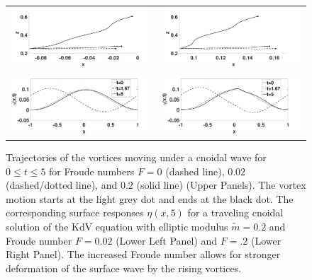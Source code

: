 \documentclass[a4paper,11pt]{article}
\begin{document}
\begin{figure}[h]
\centering
\begin{tabular}{cc}
\includegraphics[width=.48\textwidth]{leftside_cnoid_tracks} & 
\includegraphics[width=.48\textwidth]{rightside_cnoid_tracks}\\
\includegraphics[width=.48\textwidth]{surf_resp_cnoid_mu_pt2_F_pt02_tf_5NEW} & 
\includegraphics[width=.48\textwidth]{surf_resp_cnoid_mu_pt2_F_pt2_tf_5NEW}
\end{tabular}
\caption{\small Trajectories of the vortices moving under a cnoidal wave for $0\leq t \leq 5$ for Froude numbers $F=0$ (dashed line), $0.02$ (dashed/dotted line), and $0.2$ (solid line) (Upper Panels).  The vortex motion starts at the light grey dot and ends at the black dot. The corresponding surface responses $\eta(x,5)$ for a traveling cnoidal solution of the KdV equation with elliptic modulus $\tilde{m}=0.2$ and Froude number $F=0.02$ (Lower Left Panel) and $F=.2$ (Lower Right Panel). The increased Froude number allows for stronger deformation of the surface wave by the rising vortices.}
\label{fig:cntrack}
\end{figure}

\end{document}

